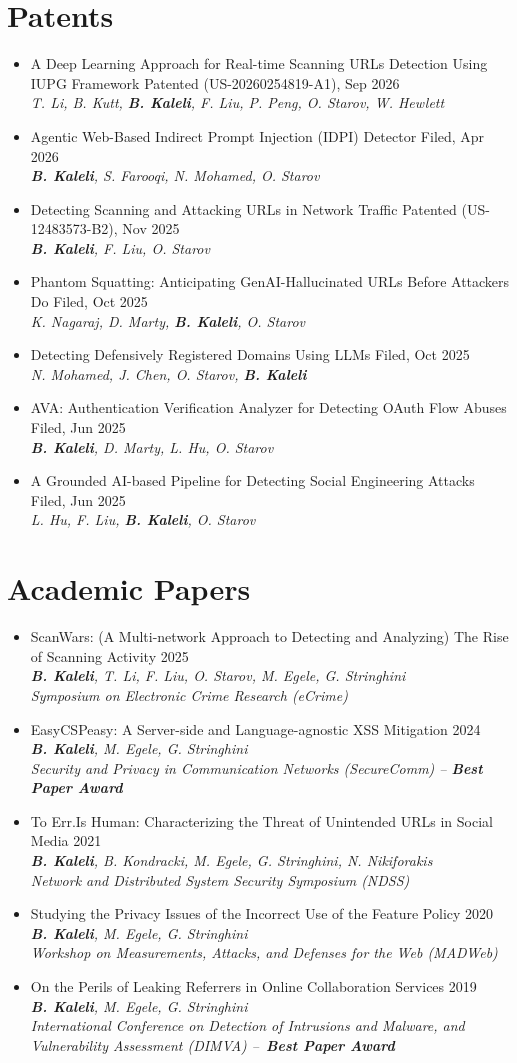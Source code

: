 \documentclass[letterpaper,11pt]{article}
\newcommand{\resumePublicationHeading}[4]{
    \item {\small #1} \hfill {\small #2}\\
      \textit{\small #3}\\
      \textit{\footnotesize #4}\vspace{-9pt}
}
\newcommand{\resumePatentHeading}[3]{
    \item {\small #1} \hfill {\small #2}\\
    \textit{\small #3}\vspace{-11pt}
}
\newcommand{\resumeItemListStart}{\begin{itemize}[leftmargin=0.15in, label={$\bullet$}, topsep=0pt]}
\newcommand{\resumeItemListEnd}{\end{itemize}}
\begin{document}
\section{Patents}
  \resumeItemListStart
    \resumePatentHeading
        {A Deep Learning Approach for Real-time Scanning URLs Detection Using IUPG Framework}
        {Patented (US-20260254819-A1), Sep 2026}
        {T. Li, B. Kutt, \textbf{B. Kaleli}, F. Liu, P. Peng, O. Starov, W. Hewlett}
    \resumePatentHeading
        {Agentic Web-Based Indirect Prompt Injection (IDPI) Detector}
        {Filed, Apr 2026}
        {\textbf{B. Kaleli}, S. Farooqi, N. Mohamed, O. Starov}
    \resumePatentHeading
        {Detecting Scanning and Attacking URLs in Network Traffic}{Patented (US-12483573-B2), Nov 2025}
        {\textbf{B. Kaleli}, F. Liu, O. Starov}
    \resumePatentHeading
        {Phantom Squatting: Anticipating GenAI-Hallucinated URLs Before Attackers Do}{Filed, Oct 2025}
        {K. Nagaraj, D. Marty, \textbf{B. Kaleli}, O. Starov}
    \resumePatentHeading
        {Detecting Defensively Registered Domains Using LLMs}
        {Filed, Oct 2025}
        {N. Mohamed, J. Chen, O. Starov, \textbf{B. Kaleli}}
    \resumePatentHeading
        {AVA: Authentication Verification Analyzer for Detecting OAuth Flow Abuses}{Filed, Jun 2025}
        {\textbf{B. Kaleli}, D. Marty, L. Hu, O. Starov}
    \resumePatentHeading
        {A Grounded AI-based Pipeline for Detecting Social Engineering Attacks}
        {Filed, Jun 2025}
        {L. Hu, F. Liu, \textbf{B. Kaleli}, O. Starov}
  \resumeItemListEnd
\vspace{0.01in}

\section{Academic Papers}
  \resumeItemListStart
    \resumePublicationHeading
        {ScanWars: (A Multi-network Approach to Detecting and Analyzing) The Rise of Scanning Activity}{2025}
        {\textbf{B. Kaleli}, T. Li, F. Liu, O. Starov, M. Egele, G. Stringhini}{Symposium on Electronic Crime Research (eCrime)}
    \resumePublicationHeading
        {EasyCSPeasy: A Server-side and Language-agnostic XSS Mitigation}{2024}
        {\textbf{B. Kaleli}, M. Egele, G. Stringhini}{Security and Privacy in Communication Networks (SecureComm) -- \textbf{Best Paper Award}}
    \resumePublicationHeading
        {To Err.Is Human: Characterizing the Threat of Unintended URLs in Social Media}{2021}
        {\textbf{B. Kaleli}, B. Kondracki, M. Egele, G. Stringhini, N. Nikiforakis}{Network and Distributed System Security Symposium (NDSS)}
    \resumePublicationHeading
        {Studying the Privacy Issues of the Incorrect Use of the Feature Policy}{2020}
        {\textbf{B. Kaleli}, M. Egele, G. Stringhini}{Workshop on Measurements, Attacks, and Defenses for the Web (MADWeb)}
    \resumePublicationHeading
        {On the Perils of Leaking Referrers in Online Collaboration Services}{2019}
        {\textbf{B. Kaleli}, M. Egele, G. Stringhini}{International Conference on Detection of Intrusions and Malware, and Vulnerability Assessment (DIMVA) --~\textbf{Best Paper Award}}
  \resumeItemListEnd
\vspace{0.01in}
\end{document}
